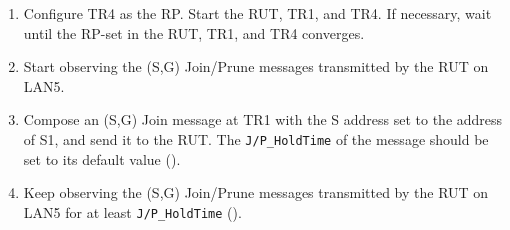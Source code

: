 \documentclass[11pt]{report}
\begin{document}
\begin{enumerate}

  \item Configure TR4 as the RP. Start the RUT, TR1, and TR4. If
  necessary, wait until the RP-set in the RUT, TR1, and TR4
  converges.

  \item Start observing the (S,G) Join/Prune messages transmitted by the
  RUT on LAN5.

  \item Compose an (S,G) Join message at TR1 with the S address set to the
  address of S1, and send it to the RUT. 
  The \verb=J/P_HoldTime= of the message should be set to its default
  value ({\PimsmJPHoldTime}).

  \item Keep observing the (S,G) Join/Prune messages transmitted by the
  RUT on LAN5 for at least \verb=J/P_HoldTime= ({\PimsmJPHoldTime}).

\end{enumerate}

\end{document}
